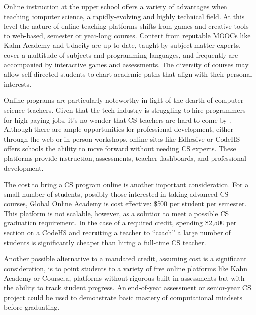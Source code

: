 Online instruction at the upper school offers a variety of advantages when teaching computer science, a rapidly-evolving and highly technical field. At this level the nature of online teaching platforms shifts from games and creative tools to web-based, semester or year-long courses. Content from reputable MOOCs like Kahn Academy and Udacity are up-to-date, taught by subject matter experts, cover a multitude of subjects and programming languages, and frequently are accompanied by interactive games and assessments. The diversity of courses may allow self-directed students to chart academic paths that align with their personal interests. \par
Online programs are particularly noteworthy in light of the dearth of computer science teachers. Given that the tech industry is struggling to hire programmers for high-paying jobs, it's no wonder that CS teachers are hard to come by \cite{washpostcs}. Although there are ample opportunities for professional development, either through the web or in-person workshops, online sites like Edhesive or CodeHS offers schools the ability to move forward without needing CS experts. These platforms provide instruction, assessments, teacher dashboards, and professional development.\par
The cost to bring a CS program online is another important consideration. For a small number of students, possibly those interested in taking advanced CS courses, Global Online Academy is cost effective: \$500 per student per semester. This platform is not scalable, however, as a solution to meet a possible CS graduation requirement. In the case of a required credit, spending \$2,500 per section on a CodeHS and recruiting a teacher to ``coach'' a large number of students is significantly cheaper than hiring a full-time CS teacher. \par
Another possible alternative to a mandated credit, assuming cost is a significant consideration, is to point students to a variety of free online platforms like Kahn Academy or Coursera, platforms without rigorous built-in assessments but with the ability to track student progress. An end-of-year assessment or senior-year CS project could be used to demonstrate basic mastery of computational mindsets before graduating. \par

